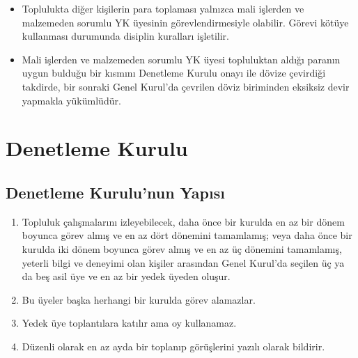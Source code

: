 \documentclass[11pt,a4paper]{article}
\begin{document}
\begin{enumerate}
\begin{itemize}
        \item Toplulukta diğer kişilerin para toplaması yalnızca mali işlerden ve malzemeden sorumlu YK üyesinin görevlendirmesiyle olabilir. Görevi kötüye kullanması durumunda disiplin kuralları işletilir.
        \item Mali işlerden ve malzemeden sorumlu YK üyesi topluluktan aldığı paranın uygun bulduğu bir kısmını Denetleme Kurulu onayı ile dövize çevirdiği takdirde, bir sonraki Genel Kurul’da çevrilen döviz biriminden eksiksiz devir yapmakla yükümlüdür.
    \end{itemize}
\end{enumerate}

\section{Denetleme Kurulu}

\subsection{Denetleme Kurulu'nun Yapısı}
\begin{enumerate}
    \item Topluluk çalışmalarını izleyebilecek, daha önce bir kurulda en az bir dönem boyunca görev almış ve en az dört dönemini tamamlamış; veya daha önce bir kurulda iki dönem boyunca görev almış ve en az üç dönemini tamamlamış, yeterli bilgi ve deneyimi olan kişiler arasından Genel Kurul’da seçilen üç ya da beş asil üye ve en az bir yedek üyeden oluşur.
    \item Bu üyeler başka herhangi bir kurulda görev alamazlar.
    \item Yedek üye toplantılara katılır ama oy kullanamaz.
    \item Düzenli olarak en az ayda bir toplanıp görüşlerini yazılı olarak bildirir.
\end{enumerate}
\end{document}
